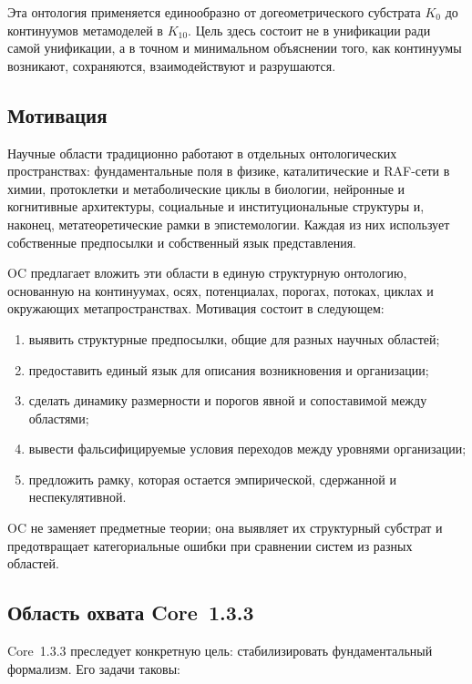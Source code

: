 Эта онтология применяется единообразно от догеометрического субстрата \(K_0\) до континуумов метамоделей в \(K_{10}\). Цель здесь состоит не в унификации ради самой унификации, а в точном и минимальном объяснении того, как континуумы возникают, сохраняются, взаимодействуют и разрушаются.

\subsection{Мотивация}

Научные области традиционно работают в отдельных онтологических пространствах: фундаментальные поля в физике, каталитические и RAF-сети в химии, протоклетки и метаболические циклы в биологии, нейронные и когнитивные архитектуры, социальные и институциональные структуры и, наконец, метатеоретические рамки в эпистемологии. Каждая из них использует собственные предпосылки и собственный язык представления.

OC предлагает вложить эти области в единую структурную онтологию, основанную на континуумах, осях, потенциалах, порогах, потоках, циклах и окружающих метапространствах. Мотивация состоит в следующем:

\begin{enumerate}
    \item выявить структурные предпосылки, общие для разных научных областей;
    \item предоставить единый язык для описания возникновения и организации;
    \item сделать динамику размерности и порогов явной и сопоставимой между областями;
    \item вывести фальсифицируемые условия переходов между уровнями организации;
    \item предложить рамку, которая остается эмпирической, сдержанной и неспекулятивной.
\end{enumerate}

OC не заменяет предметные теории; она выявляет их структурный субстрат и предотвращает категориальные ошибки при сравнении систем из разных областей.

\subsection{Область охвата Core~1.3.3}

Core~1.3.3 преследует конкретную цель: стабилизировать фундаментальный формализм. Его задачи таковы:

